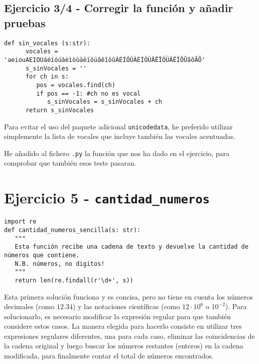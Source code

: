 \subsection{Ejercicio 3/4 - Corregir la función y añadir pruebas}

\begin{lstlisting}[captionpos=b,caption={\lstinline|sin_vocales()| corregida}, label={code:sin_vocales}]
   def sin_vocales (s:str):
      vocales = 'aeiouAEIOUáéíóúàèìòùäëïöüâêîôûÁÉÍÓÚÀÈÌÒÙÄËÏÖÜÂÊÎÔÛãõÃÕ'
      s_sinVocales = ''
      for ch in s:
         pos = vocales.find(ch)
         if pos == -1: #ch no es vocal
            s_sinVocales = s_sinVocales + ch
      return s_sinVocales
\end{lstlisting}

Para evitar el uso del paquete adicional \lstinline{unicodedata}, he preferido utilizar simplemente la lista de vocales que incluye también las vocales acentuadas.

He añadido al fichero \texttt{.py} la función que nos ha dado en el ejercicio, para comprobar que también esos tests pasaran.

\newpage
\section{Ejercicio 5 - \texttt{cantidad\_numeros}}
\begin{lstlisting}[captionpos=b,caption={Solución sencilla}]
import re
def cantidad_numeros_sencilla(s: str):
   """
   Esta función recibe una cadena de texto y devuelve la cantidad de números que contiene.
   N.B. números, no digitos!
   """
   return len(re.findall(r'\d+', s))
\end{lstlisting}

Esta primera solución funciona y es concisa, pero no tiene en cuenta los números decimales (como $12.34$) y las notaciones científicas (como $12\cdot 10^6$ o $10^{-2}$). 
Para solucionarlo, es necesario modificar la expresión regular para que también considere estos casos.
La manera elegida para hacerlo consiste en utilizar tres expresiones regulares diferentes, una para cada caso, eliminar las coincidencias de la cadena original y luego buscar los números restantes (enteros) en la cadena modificada, para finalmente contar el total de números encontrados.

